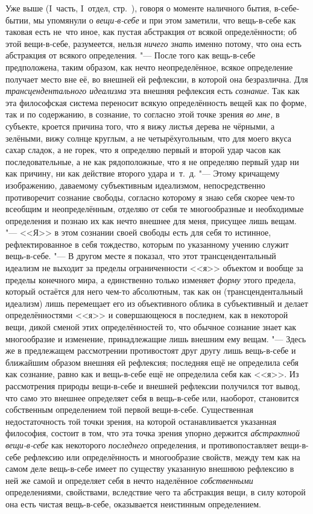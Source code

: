 Уже выше (I~часть, I~отдел, стр.~\pageref{bkm:bmThingInItself}), говоря о
моменте наличного бытия, в-себе-бытии, мы упомянули о
{\em вещи-в-себе} и при этом заметили, что вещь-в-себе
как таковая есть не~что иное, как пустая абстракция от всякой
определённости; об этой вещи-в-себе, разумеется, нельзя
{\em ничего знать} именно потому, что она есть
абстракция от всякого определения. "--- После того как вещь-в-себе
предположена, таким образом, как нечто неопределённое, всякое определение
получает место вне её, во внешней ей рефлексии, в которой она безразлична.
Для {\em трансцендентального идеализма} эта внешняя
рефлексия есть {\em сознание}. Так как эта философская
система переносит всякую определённость вещей как по форме, так и по
содержанию, в сознание, то согласно этой точке зрения
{\em во мне,} в субъекте, кроется причина того, что я
вижу листья дерева не чёрными, а зелёными, вижу солнце круглым, а не
четырёхугольным, что для моего вкуса сахар сладок, а не горек, что я
определяю первый и второй удар часов как последовательные, а не как
рядоположные, что я не определяю первый удар ни как причину, ни как
действие второго удара и~т.~д. "--- Этому кричащему изображению, даваемому
субъективным идеализмом, непосредственно противоречит сознание свободы,
согласно которому я знаю себя скорее чем-то всеобщим и неопределённым,
отделяю от себя те многообразные и необходимые определения и познаю их как
нечто внешнее для меня, присущее лишь вещам. "--- <<Я>> в этом сознании своей
свободы есть для себя то истинное, рефлектированное в себя тождество,
которым по указанному учению служит вещь-в-себе. "--- В другом месте я
показал, что этот трансцендентальный идеализм не выходит за пределы
ограниченности <<я>> объектом и вообще за пределы конечного мира, а
единственно только изменяет {\em форму} этого предела,
который остаётся для него чем-то абсолютным, так как он (трансцендентальный
идеализм) лишь перемещает его из объективного облика в субъективный и
делает определённостями <<я>> и совершающеюся в последнем, как в некоторой
вещи, дикой сменой этих определённостей то, что обычное сознание знает как
многообразие и изменение, принадлежащие лишь внешним ему вещам. "--- Здесь же
в предлежащем рассмотрении противостоят друг другу лишь вещь-в-себе и
ближайшим образом внешняя ей рефлексия; последняя ещё не определила себя
как сознание, равно как и вещь-в-себе ещё не определила себя как <<я>>. Из
рассмотрения природы вещи-в-себе и внешней рефлексии получился тот вывод,
что само это внешнее определяет себя в вещь-в-себе или, наоборот,
становится собственным определением той первой вещи-в-себе. Существенная
недостаточность той точки зрения, на которой останавливается указанная
философия, состоит в том, что эта точка зрения упорно держится
{\em абстрактной вещи-в-себе} как некоторого
{\em последнего} определения, и противопоставляет
вещи-в-себе рефлексию или определённость и многообразие свойств, между тем
как на самом деле вещь-в-себе имеет по существу указанную внешнюю рефлексию
в ней же самой и определяет себя в нечто наделённое
{\em собственными} определениями, свойствами,
вследствие чего та абстракция вещи, в силу которой она есть чистая
вещь-в-себе, оказывается неистинным определением.

